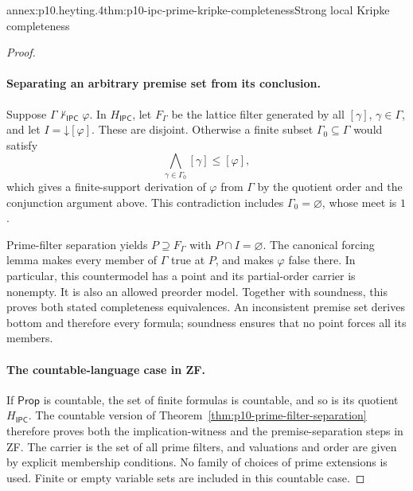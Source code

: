 \begin{annexitem}{annex:p10.heyting.4}{thm:p10-ipc-prime-kripke-completeness}{Strong local Kripke completeness}
\begin{proof}
\paragraph{Separating an arbitrary premise set from its conclusion.}
Suppose \(\Gamma\not\vdash_{\mathsf{IPC}}\varphi\).
In \(H_{\mathsf{IPC}}\), let \(F_\Gamma\) be the lattice
filter generated by all \([\gamma]\), \(\gamma\in\Gamma\),
and let \(I=\mathord{\downarrow}[\varphi]\).
These are disjoint.
Otherwise a finite subset \(\Gamma_0\subseteq\Gamma\)
would satisfy
\[
 \bigwedge_{\gamma\in\Gamma_0}[\gamma]\leq[\varphi],
\]
which gives a finite-support derivation of \(\varphi\)
from \(\Gamma\) by the quotient order and the conjunction
argument above.
This contradiction includes \(\Gamma_0=\varnothing\),
whose meet is \(1\).

Prime-filter separation yields \(P\supseteq F_\Gamma\)
with \(P\cap I=\varnothing\).
The canonical forcing lemma makes every member of \(\Gamma\)
true at \(P\), and makes \(\varphi\) false there.
In particular, this countermodel has a point and its
partial-order carrier is nonempty.
It is also an allowed preorder model.
Together with soundness, this proves both stated completeness
equivalences.
An inconsistent premise set derives bottom and therefore
every formula; soundness ensures that no point forces all
its members.

\paragraph{The countable-language case in ZF.}
If \(\mathsf{Prop}\) is countable, the set of finite formulas
is countable, and so is its quotient \(H_{\mathsf{IPC}}\).
The countable version of
Theorem~\ref{thm:p10-prime-filter-separation} therefore proves
both the implication-witness and the premise-separation steps
in ZF.
The carrier is the set of all prime filters, and valuations
and order are given by explicit membership conditions.
No family of choices of prime extensions is used.
Finite or empty variable sets are included in this countable case.
\end{proof}
\end{annexitem}
